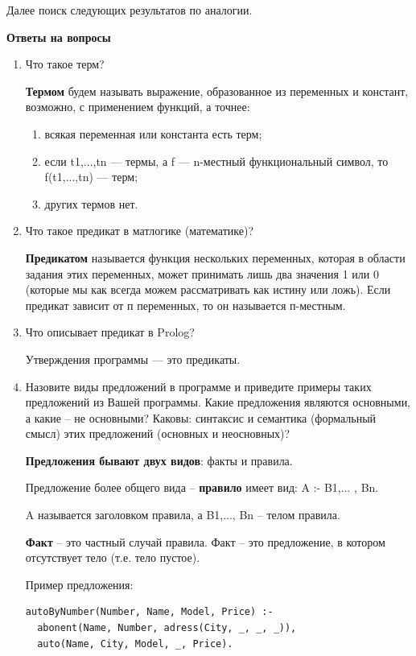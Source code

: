 \documentclass[a4paper,14pt]{extreport} %
\begin{document}
Далее поиск следующих результатов по аналогии. 

\hfill

\textbf{Ответы на вопросы}

\begin{enumerate}
\item Что такое терм?

\textbf{Термом} будем называть выражение, образованное из переменных и констант, возможно, с применением функций, а точнее:
\begin{enumerate}
\item всякая переменная или константа есть терм;
\item если t1,...,tn — термы, а f — n-местный функциональный символ,
то f(t1,...,tn) — терм;
\item других термов нет.

\end{enumerate}
\item Что такое предикат в матлогике (математике)?

\textbf{Предикатом} называется функция нескольких переменных, которая в области задания этих переменных, может принимать лишь два значения 1 или 0 (которые мы как всегда можем рассматривать как истину или ложь).
Если предикат зависит от п переменных, то он называется п-местным.

\item Что описывает предикат в Prolog?

Утверждения программы — это предикаты. 

\item Назовите виды предложений в программе и приведите примеры таких предложений из Вашей программы. Какие предложения являются основными, а какие – не основными?  Каковы: синтаксис и семантика (формальный смысл) этих предложений (основных и неосновных)?

\textbf{Предложения бывают двух видов}: факты и правила. 

Предложение более общего вида -- \textbf{правило} имеет вид:
	A :- B1,... , Bn. 

A называется заголовком правила, а B1,..., Bn -- телом правила.

\textbf{Факт} -- это частный случай правила. Факт -- это предложение, в котором отсутствует тело (т.е. тело пустое). 

Пример предложения:
\begin{lstlisting}
autoByNumber(Number, Name, Model, Price) :- 
  abonent(Name, Number, adress(City, _, _, _)),
  auto(Name, City, Model, _, Price).
\end{lstlisting}


\end{enumerate}
\end{document}

